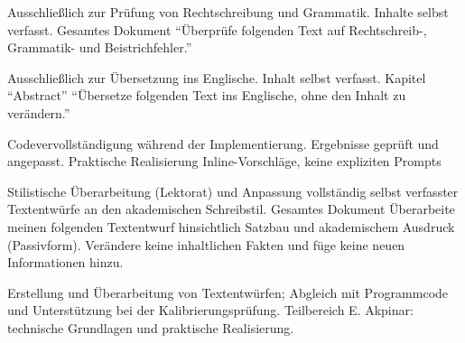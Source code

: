
  {Ausschließlich zur Prüfung von Rechtschreibung und Grammatik. Inhalte selbst verfasst.}
  {Gesamtes Dokument}
  {\enquote{Überprüfe folgenden Text auf Rechtschreib-, Grammatik- und Beistrichfehler.}}

  {Ausschließlich zur Übersetzung ins Englische. Inhalt selbst verfasst.}
  {Kapitel \enquote{Abstract}}
  {\enquote{Übersetze folgenden Text ins Englische, ohne den Inhalt zu verändern.}}

  {Codevervollständigung während der Implementierung. Ergebnisse geprüft und angepasst.}
  {Praktische Realisierung}
  {Inline-Vorschläge, keine expliziten Prompts}

  {Stilistische Überarbeitung (Lektorat) und Anpassung vollständig selbst verfasster Textentwürfe an den akademischen Schreibstil.}
  {Gesamtes Dokument}
  {Überarbeite meinen folgenden Textentwurf hinsichtlich Satzbau und akademischem Ausdruck (Passivform). Verändere keine inhaltlichen Fakten und füge keine neuen Informationen hinzu.}

  {Erstellung und Überarbeitung von Textentwürfen;
   Abgleich mit Programmcode und Unterstützung bei der Kalibrierungsprüfung.}
  {Teilbereich E. Akpinar: technische Grundlagen und praktische Realisierung.}
  {\cite{akpinar-codex-20261029a,akpinar-codex-20261029b,akpinar-codex-20261029c}}
